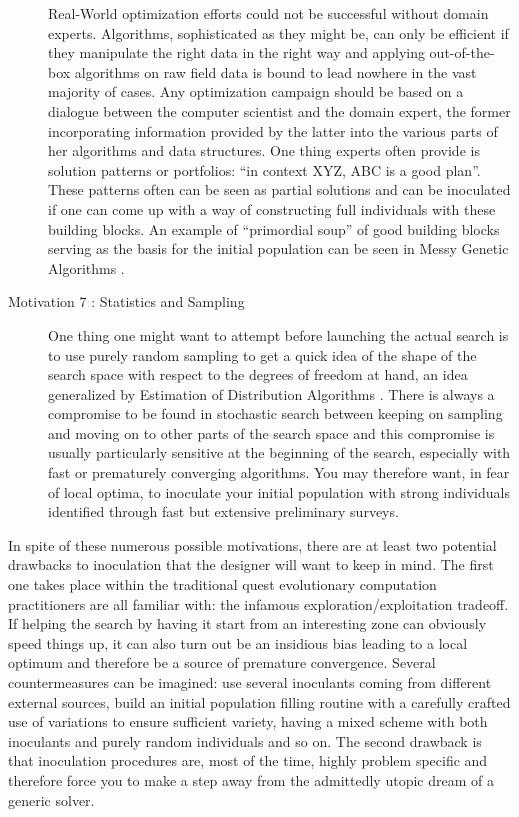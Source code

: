 \documentclass[english]{DESCARWINreport}
\begin{document}
\begin{description}
Real-World optimization efforts could not be successful without domain experts. Algorithms, sophisticated as they might be, can only be efficient if they manipulate the right data in the right way and applying out-of-the-box algorithms on raw field data is bound to lead nowhere in the vast majority of cases. Any optimization campaign should be based on a dialogue between the computer scientist and the domain expert, the former incorporating information provided by the latter into the various parts of her algorithms and data structures. One thing experts often provide is solution patterns or portfolios: "`in context XYZ, ABC is a good plan"'. These patterns often can be seen as partial solutions and can be inoculated if one can come up with a way of constructing full individuals with these building blocks. An example of "`primordial soup"' of good building blocks serving as the basis for the initial population can be seen in Messy Genetic Algorithms \cite{Kargupta95search}.

\item[Motivation 7 : Statistics and Sampling]

One thing one might want to attempt before launching the actual search is to use purely random sampling to get a quick idea of the shape of the search space with respect to the degrees of freedom at hand, an idea generalized by Estimation of Distribution Algorithms \cite{Baluja95removingthe, Larranaga:2002b}
. There is always a compromise to be found in stochastic search between keeping on sampling and moving on to other parts of the search space and this compromise is usually particularly sensitive at the beginning of the search, especially with fast or prematurely converging algorithms. You may therefore want, in fear of local optima, to inoculate your initial population with strong individuals identified through fast but extensive preliminary surveys.


\end{description}


In spite of these numerous possible motivations, there are at least two potential drawbacks to inoculation that the designer will want to keep in mind. The first one takes place within the traditional quest evolutionary computation practitioners are all familiar with: the infamous exploration/exploitation tradeoff. If helping the search by having it start from an interesting zone can obviously speed things up, it can also turn out be an insidious bias leading to a local optimum and therefore be a source of premature convergence. Several countermeasures can be imagined: use several inoculants coming from different external sources, build an initial population filling routine with a carefully crafted use of variations to ensure sufficient variety, having a mixed scheme with both inoculants and purely random individuals and so on. The second drawback is that inoculation procedures are, most of the time, highly problem specific and therefore force you to make a step away from the admittedly utopic dream of a generic solver.
\end{document}
